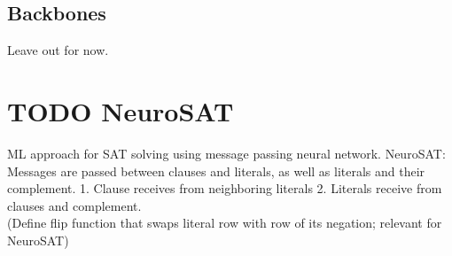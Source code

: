 \subsection{Backbones}
Leave out for now.

\section{TODO NeuroSAT}
ML approach for SAT solving using message passing neural network.
NeuroSAT\cite{selsam2018learning}: Messages are passed between clauses and literals, as well as literals and their complement. 1. Clause receives from neighboring literals 2. Literals receive from clauses and complement. \\
(Define flip function that swaps literal row with row of its negation; relevant for NeuroSAT)